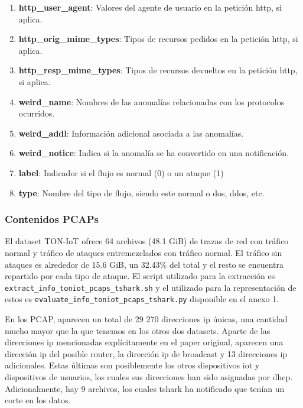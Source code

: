 \begin{enumerate}
  \item \textbf{http\_user\_agent}: Valores del agente de usuario en la petición \acrshort{http}, si aplica.
  \item \textbf{http\_orig\_mime\_types}: Tipos de recursos pedidos en la petición \acrshort{http}, si aplica.
  \item \textbf{http\_resp\_mime\_types}: Tipos de recursos devueltos en la petición \acrshort{http}, si aplica.
  \item \textbf{weird\_name}: Nombres de las anomalías relacionadas con los protocolos ocurridos.
  \item \textbf{weird\_addl}: Información adicional asociada a las anomalías.
  \item \textbf{weird\_notice}: Indica si la anomalía se ha convertido en una notificación.
  \item \textbf{label}: Indicador si el flujo es normal (0) o un ataque (1)
  \item \textbf{type}: Nombre del tipo de flujo, siendo este normal o \acrshort{dos}, \acrshort{ddos}, etc.
\end{enumerate}

\subsubsection{Contenidos PCAPs}

El dataset TON-IoT ofrece 64 archivos (48.1 GiB) de trazas de red con tráfico normal y tráfico de  ataques entremezclados con tráfico normal. El tráfico sin ataques es alrededor de 15.6 GiB, un 32.43\% del total y el resto se encuentra repartido por cada tipo de ataque. El script utilizado para la extracción es \texttt{extract\_info\_toniot\_pcaps\_tshark.sh} y el utilizado para la representación de estos es \texttt{evaluate\_info\_toniot\_pcaps\_tshark.py} disponible en el anexo 1.

En los PCAP, aparecen un total de 29 270 direcciones \acrshort{ip} únicas, una cantidad mucho mayor que la que tenemos en los otros dos datasets. Aparte de las direcciones \acrshort{ip} mencionadas explícitamente en el paper original, aparecen una dirección \acrshort{ip} del posible router, la dirección \acrshort{ip} de broadcast y 13 direcciones \acrshort{ip} adicionales. Estas últimas son posiblemente los otros dispositivos \acrshort{iot} y dispositivos de usuarios, los cuales sus direcciones han sido asignadas por \acrshort{dhcp}. Adicionalmente, hay 9 archivos, los cuales tshark ha notificado que tenían un corte en los datos.

